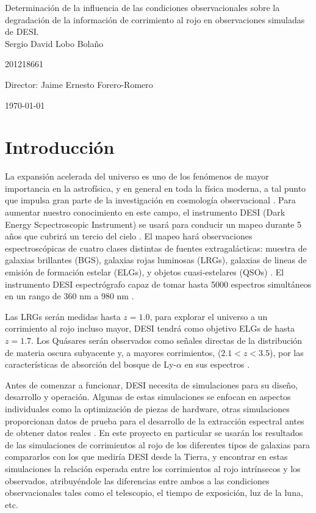 \documentclass[12pt]{article}
\begin{document}
\begin{center}
\huge
Determinación de la influencia de las condiciones observacionales sobre la degradación de la informaci\'on de corrimiento al rojo en observaciones simuladas de DESI.\\
\vspace{3mm}
\Large Sergio David Lobo Bolaño

\large
201218661

\vspace{2mm}
\Large
Director: Jaime Ernesto Forero-Romero


\vspace{2mm}

\today
\end{center}


\section{Introducción}

La expansión acelerada del universo es uno de los fenómenos de mayor
importancia en la astrofísica, y en general en toda la física moderna,
a tal punto que impulsa gran parte de la investigación en cosmología
observacional \cite{Nord:2016plv}. Para aumentar nuestro conocimiento
en este campo, el instrumento DESI (Dark Energy Scpectroscopic
Instrument) se usará para conducir un mapeo durante 5 años que cubrirá
un tercio del cielo \cite{Aghamousa:2016zmz}. El mapeo hará observaciones
espectroscópicas de cuatro clases distintas de fuentes
extragalácticas:   muestra de galaxias brillantes (BGS), galaxias rojas luminosas (LRGs), galaxias de lineas de emisión de formación estelar (ELGs), y objetos cuasi-estelares (QSOs) \cite{Aghamousa:2016zmz}. El instrumento DESI espectrógrafo capaz de tomar hasta 5000 espectros simultáneos en un rango de 360 nm a 980 nm \cite{Aghamousa:2016sne}. 

Las LRGs serán medidas hasta $z = 1.0$, para explorar el universo a un corrimiento al rojo incluso mayor, DESI tendrá como objetivo ELGs de hasta $z = 1.7$. Los Quásares serán observados como señales directas de la distribución de materia oscura subyacente y, a mayores corrimientos, ($2.1<z<3.5$), por las características de absorción del bosque de Ly-$\alpha$ en sus espectros \cite{Aghamousa:2016zmz}. 

Antes de comenzar a funcionar, DESI necesita de simulaciones para su
diseño, desarrollo y operación. Algunas de estas simulaciones se
enfocan en aspectos individuales como la optimización de piezas de
hardware, otras simulaciones proporcionan datos de prueba para el
desarrollo de la extracción espectral antes de obtener datos reales
\cite{Aghamousa:2016sne}. En este proyecto en particular se usarán los
resultados de las simulaciones de corrimientos al rojo de los
diferentes tipos de galaxias para compararlos con los que mediría DESI
desde la Tierra, y encontrar en estas simulaciones la relación
esperada entre los corrimientos al rojo intr\'insecos y los observados,
atribuyéndole las diferencias entre ambos a las condiciones
observacionales tales como el telescopio, el tiempo de exposición, luz
de la luna, etc.   
\end{document}
